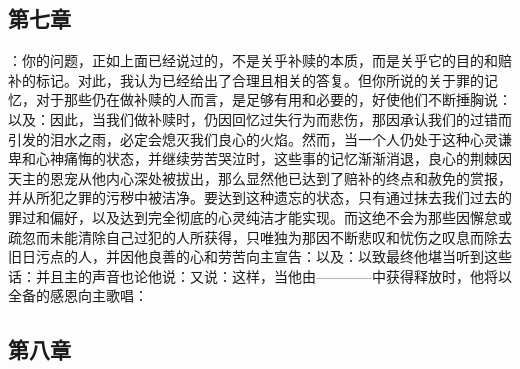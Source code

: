
\subsection{第七章}

\par

：你的问题，正如上面已经说过的，不是关乎补赎的本质，而是关乎它的目的和赔补的标记。对此，我认为已经给出了合理且相关的答复。但你所说的关于罪的记忆，对于那些仍在做补赎的人而言，是足够有用和必要的，好使他们不断捶胸说：以及：因此，当我们做补赎时，仍因回忆过失行为而悲伤，那因承认我们的过错而引发的泪水之雨，必定会熄灭我们良心的火焰。然而，当一个人仍处于这种心灵谦卑和心神痛悔的状态，并继续劳苦哭泣时，这些事的记忆渐渐消退，良心的荆棘因天主的恩宠从他内心深处被拔出，那么显然他已达到了赔补的终点和赦免的赏报，并从所犯之罪的污秽中被洁净。要达到这种遗忘的状态，只有通过抹去我们过去的罪过和偏好，以及达到完全彻底的心灵纯洁才能实现。而这绝不会为那些因懈怠或疏忽而未能清除自己过犯的人所获得，只唯独为那因不断悲叹和忧伤之叹息而除去旧日污点的人，并因他良善的心和劳苦向主宣告：以及：以致最终他堪当听到这些话：并且主的声音也论他说：又说：这样，当他由————中获得释放时，他将以全备的感恩向主歌唱：\par


\subsection{第八章}

\par

